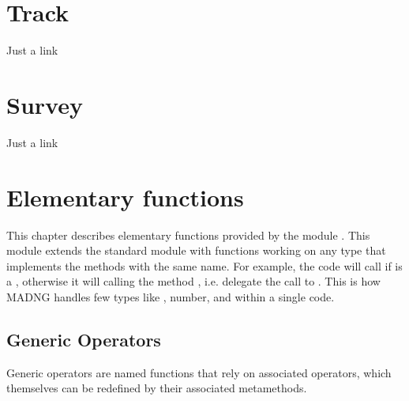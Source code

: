 \documentclass[letterpaper,10pt,english]{sphinxmanual}
\begin{document}
\chapter{Track}
\label{\detokenize{track:track}}\label{\detokenize{track::doc}}
\sphinxAtStartPar
Just a link

\sphinxstepscope


\chapter{Survey}
\label{\detokenize{survey:survey}}\label{\detokenize{survey::doc}}
\sphinxAtStartPar
Just a link

\sphinxstepscope

\ignorespaces 

\chapter{Elementary functions}
\label{\detokenize{functions:elementary-functions}}\label{\detokenize{functions:index-0}}\label{\detokenize{functions::doc}}
\sphinxAtStartPar
This chapter describes elementary functions provided by the module . This module extends the standard module  with  functions working on any type that implements the methods with the same name. For example, the code  will call  if  is a , otherwise it will calling the method , i.e. delegate the call to . This is how MAD\sphinxhyphen{}NG handles few types like ,  number,  and  within a single code.


\section{Generic Operators}
\label{\detokenize{functions:generic-operators}}
\sphinxAtStartPar
Generic operators are named functions that rely on associated operators, which themselves can be redefined by their associated metamethods.
\end{document}
